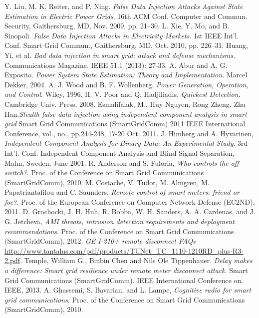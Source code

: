 \documentclass[11pt,oneside]{book}
\begin{document}
\begin{thebibliography}{99}
 Y. Liu, M. K. Reiter, and P. Ning. \emph{False Data Injection Attacks Against State Estimation in Electric Power Grids}. 16th ACM Conf. Computer and Commun. Security, Gaithersburg, MD, Nov. 2009, pp. 21–30.
 L. Xie, Y. Mo, and B. Sinopoli. \emph{False Data Injection Attacks in Electricity Markets}. 1st IEEE Int’l. Conf. Smart Grid Commun., Gaithersburg, MD, Oct. 2010, pp. 226–31.
 Huang, Yi, et al. \emph{Bad data injection in smart grid: attack and defense mechanisms}. Communications Magazine, IEEE 51.1 (2013): 27-33.
 A. Abur and A. G. Exposito. \emph{Power System State Estimation: Theory and Implementation}. Marcel Dekker, 2004.
 A. J. Wood and B. F. Wollenberg. \emph{Power Generation, Operation, and Control}. Wiley, 1996.
 H. V. Poor and Q. Hadjiliadis. \emph{Quickest Detection}. Cambridge Univ. Press, 2008.
 Esmalifalak, M., Huy Nguyen, Rong Zheng, Zhu Han.\emph{Stealth false data injection using independent component analysis in smart grid} Smart Grid Communications (SmartGridComm) 2011 IEEE International Conference, vol., no., pp.244-248, 17-20 Oct. 2011.
 J. Himberg and A. Hyvarinen, \emph{Independent Component Analysis for Binary Data: An Experimental Study}. 3rd Int’l. Conf. Independent Component Analysis and Blind Signal Separation, Malm, Sweden, June 2001.
 R. Anderson and S. Fuloria, \emph{Who controls the off switch?}. Proc. of the Conference on Smart Grid Communications (SmartGridComm), 2010.
 M. Costache, V. Tudor, M. Almgren, M. Papatriantafilou and C. Saunders. \emph{Remote control of smart meters: friend or foe?}. Proc. of the European Conference on Computer Network Defense (EC2ND), 2011.
 D. Grochocki, J. H. Huh, R. Bobba, W. H. Sanders, A. A. Cardenas, and J. G. Jetcheva, \emph{AMI threats, intrusion detection requirements and deployment recommendations}. Proc. of the Conference on Smart Grid Communications (SmartGridComm), 2012.
 \emph{GE I-210+ remote disconnect FAQs} \url{http://www.tantalus.com/pdf/products/TUNet_TC_1110-1210RD_plus-R3-2.pdf}.
 Temple, William G., Binbin Chen and Nils Ole Tippenhauer. \emph{Delay makes a difference: Smart grid resilience under remote meter disconnect attack}. Smart Grid Communications (SmartGridComm). IEEE International Conference on. IEEE, 2013.
 A. Ghassemi, S. Bavarian, and L. Lampe, \emph{Cognitive radio for smart grid communications}. Proc. of the Conference on Smart Grid Communications (SmartGridComm), 2010.

\end{thebibliography}
\end{document}
